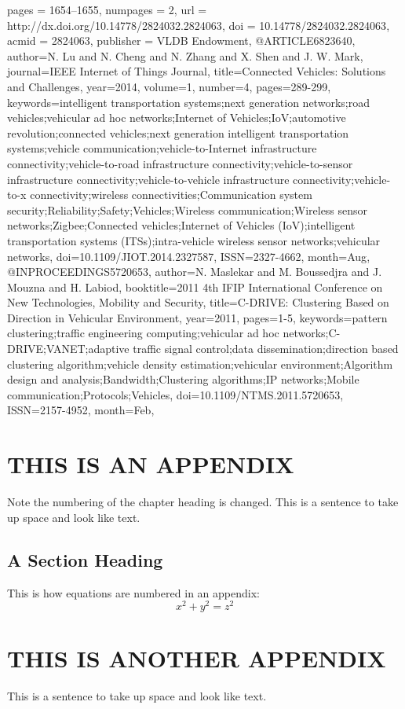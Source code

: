\documentclass{thesis}
\begin{document}
\begin{singlespace}
\begin{thebibliography}{99}
{     pages = {1654--1655},
     numpages = {2},
     url = {http://dx.doi.org/10.14778/2824032.2824063},
     doi = {10.14778/2824032.2824063},
     acmid = {2824063},
     publisher = {VLDB Endowment},
    } 
@ARTICLE{6823640, 
    author={N. Lu and N. Cheng and N. Zhang and X. Shen and J. W. Mark}, 
    journal={IEEE Internet of Things Journal}, 
    title={Connected Vehicles: Solutions and Challenges}, 
    year={2014}, 
    volume={1}, 
    number={4}, 
    pages={289-299}, 
    keywords={intelligent transportation systems;next generation networks;road vehicles;vehicular ad hoc networks;Internet of Vehicles;IoV;automotive revolution;connected vehicles;next generation intelligent transportation systems;vehicle communication;vehicle-to-Internet infrastructure connectivity;vehicle-to-road infrastructure connectivity;vehicle-to-sensor infrastructure connectivity;vehicle-to-vehicle infrastructure connectivity;vehicle-to-x connectivity;wireless
    connectivities;Communication system security;Reliability;Safety;Vehicles;Wireless communication;Wireless sensor networks;Zigbee;Connected vehicles;Internet of Vehicles (IoV);intelligent transportation systems (ITSs);intra-vehicle wireless sensor networks;vehicular networks}, 
    doi={10.1109/JIOT.2014.2327587}, 
    ISSN={2327-4662}, 
    month={Aug},}
@INPROCEEDINGS{5720653, 
    author={N. Maslekar and M. Boussedjra and J. Mouzna and H. Labiod}, 
    booktitle={2011 4th IFIP International Conference on New Technologies, Mobility and Security}, 
    title={C-DRIVE: Clustering Based on Direction in Vehicular Environment}, 
    year={2011}, 
    pages={1-5}, 
    keywords={pattern clustering;traffic engineering computing;vehicular ad hoc networks;C-DRIVE;VANET;adaptive traffic signal control;data dissemination;direction based clustering algorithm;vehicle density estimation;vehicular environment;Algorithm design and analysis;Bandwidth;Clustering algorithms;IP networks;Mobile communication;Protocols;Vehicles}, 
    doi={10.1109/NTMS.2011.5720653}, 
    ISSN={2157-4952}, 
    month={Feb},}

\end{thebibliography}
\end{singlespace}

\appendix    %
\chapter{THIS IS AN APPENDIX}
Note the numbering of the chapter heading is changed.
This is a sentence to take up space and look like text.
\section{A Section Heading}
This is how equations are numbered in an appendix:
\begin{equation}
x^2 + y^2 = z^2
\end{equation} 

\chapter{THIS IS ANOTHER APPENDIX}
This is a sentence to take up space and look like text.
\end{document}
